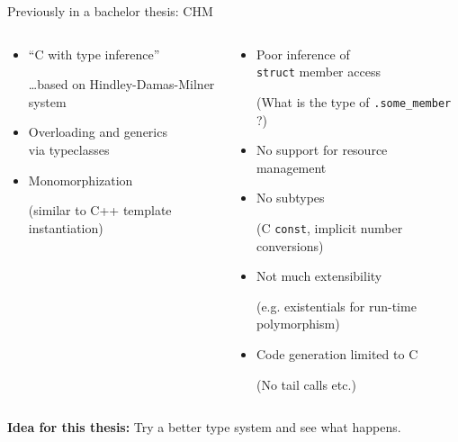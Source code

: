 \documentclass[aspectratio=169]{beamer}
\def\smll{\scriptsize}
\begin{document}
\begin{frame}{Previously in a bachelor thesis: CHM}
\begin{columns}
\begin{column}{.5\linewidth}
  \begin{itemize}\small
  \item[\color{blue!66}\faArrowRight] ``C with type inference'' \\{\smll\dots based on \alert<3>{Hindley-Damas-Milner system}\par}
  \item[\color{blue!66}\faArrowRight] Overloading and generics \\ via typeclasses
  \item[\color{blue!66}\faArrowRight] Monomorphization \\{\smll(similar to C++ template instantiation)\par}
  \end{itemize}
\end{column}\pause
\begin{column}{.5\linewidth}
  \begin{itemize}\small
  \item[\color{red}\faTimes] Poor inference of \\ \texttt{struct} member access \\ {\smll(What is the type of \texttt{.some\_member} ?)\par}
  \item[\color{red}\faTimes] No support for resource management
  \item[\color{red}\faTimes] No subtypes \\{\smll (C \texttt{const}, implicit number conversions)\par}
  \item[\color{red}\faTimes] Not much extensibility \\{\smll(e.g. existentials for run-time polymorphism)\par}
  \item[\color{red}\faTimes] Code generation limited to C \\{\smll (No tail calls etc.)\par}
  \end{itemize}
\end{column}
\end{columns}

\vspace{3ex}
\pause\textbf{Idea for this thesis:} Try a \alert{better type system} and see what happens.
\end{frame}
\end{document}
